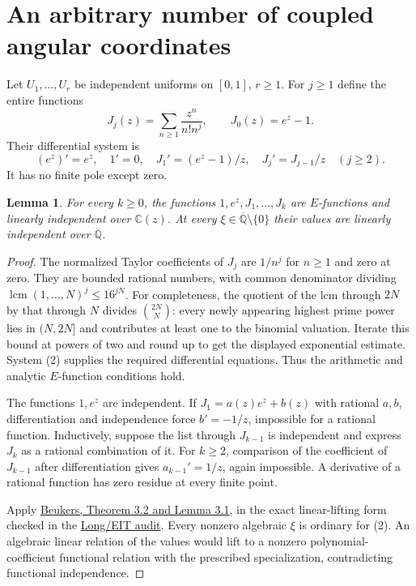 \documentclass[11pt]{article}
\newtheorem{lemma}[theorem]{Lemma}
\newcommand{\C}{\mathbb C}
\newcommand{\Qb}{\overline{\mathbb Q}}
\begin{document}
\section{An arbitrary number of coupled angular coordinates}
Let $U_1,\ldots,U_r$ be independent uniforms on $[0,1]$, $r\geq1$.
For $j\geq1$ define the entire functions
\[
 J_j(z)=\sum_{n\geq1}\frac{z^n}{n!n^j},\qquad J_0(z)=e^z-1.
\]
Their differential system is
\[
 (e^z)'=e^z,\quad 1'=0,\quad J_1'=(e^z-1)/z,
 \quad J_j'=J_{j-1}/z\quad(j\geq2).                  \tag{2}
\]
It has no finite pole except zero.

\begin{lemma}\label{lem:indep}
For every $k\geq0$, the functions $1,e^z,J_1,\ldots,J_k$ are
$E$-functions and linearly independent over $\C(z)$. At every
$\xi\in\Qb\setminus\{0\}$ their values are linearly independent over $\Qb$.
\end{lemma}
\begin{proof}
The normalized Taylor coefficients of $J_j$ are $1/n^j$ for $n\geq1$
and zero at zero. They are bounded rational numbers, with common
denominator dividing $\operatorname{lcm}(1,\ldots,N)^j\leq16^{jN}$.
For completeness, the quotient of the lcm through $2N$ by that through
$N$ divides $\binom{2N}{N}$: every newly appearing highest prime power
lies in $(N,2N]$ and contributes at least one to the binomial valuation.
Iterate this bound at powers of two and round up to get the displayed
exponential estimate. System (2) supplies the required differential
equations. Thus the arithmetic and analytic $E$-function conditions hold.

The functions $1,e^z$ are independent. If $J_1=a(z)e^z+b(z)$ with
rational $a,b$, differentiation and independence force $b'=-1/z$,
impossible for a rational function. Inductively, suppose the list through
$J_{k-1}$ is independent and express $J_k$ as a rational combination
of it. For $k\geq2$, comparison of the coefficient of $J_{k-1}$ after
differentiation gives $a_{k-1}'=1/z$, again impossible. A derivative of
a rational function has zero residue at every finite point.

Apply \href{https://arxiv.org/html/math/0405549}{Beukers, Theorem 3.2
and Lemma 3.1}, in the exact linear-lifting form checked in the
\href{LONG_EIT_AND_FC2_AUDIT.tex}{Long/EIT audit}. Every nonzero algebraic
$\xi$ is ordinary for (2). An algebraic linear relation of the values
would lift to a nonzero polynomial-coefficient functional relation with
the prescribed specialization, contradicting functional independence.
\end{proof}
\end{document}
